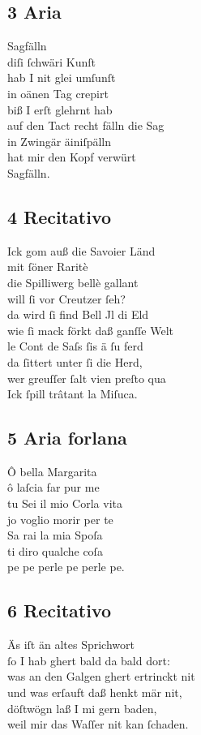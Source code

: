 \documentclass{ees}
\newenvironment{lyrics}[1]{%
  \subsection{#1}\nopagebreak%
  \begin{lyricslist}%
  \let\voice\item%
}{%
  \end{lyricslist}%
}
\begin{document}
\begin{lyrics}{3 Aria}
  \voice[Sagfäller]
  Sagfälln\\
  diſi ſchwäri Kunſt\\
  hab I nit glei umſunſt\\
  in oänen Tag crepirt\\
  biß I erſt glehrnt hab\\
  auf den Tact recht fälln die Sag\\
  in Zwingär äiniſpälln\\
  hat mir den Kopf verwürt\\
  Sagfälln.
\end{lyrics}

\begin{lyrics}{4 Recitativo}
  \voice[Savoiard]
  Ick gom auß die Savoier Länd\\
  mit ſöner Raritè\\
  die Spilliwerg bellè gallant\\
  will ſi vor Creutzer ſeh?\\
  da wird ſi find Bell Jl di Eld\\
  wie ſi mack förkt daß ganſſe Welt\\
  le Cont de Saſs ſis ä ſu ferd\\
  da ſittert unter ſi die Herd,\\
  wer greuſſer ſalt vien preſto qua\\
  Ick ſpill trâtant la Miſuca.
\end{lyrics}

\begin{lyrics}{5 Aria forlana}
  \voice[Savoiard]
  Ô bella Margarita\\
  ô laſcia far pur me\\
  tu Sei il mio Corla vita\\
  jo voglio morir per te\\
  Sa rai la mia Spoſa\\
  ti diro qualche coſa\\
  pe pe perle pe perle pe.
\end{lyrics}

\enlargethispage{\baselineskip}
\begin{lyrics}{6 Recitativo}
  \voice[H.-Krämer]
  Äs iſt än altes Sprichwort\\
  ſo I hab ghert bald da bald dort:\\
  was an den Galgen ghert ertrinckt nit\\
  und was erſauft daß henkt mär nit,\\
  döſtwögn laß I mi gern baden,\\
  weil mir das Waſſer nit kan ſchaden.
\end{lyrics}
\end{document}
